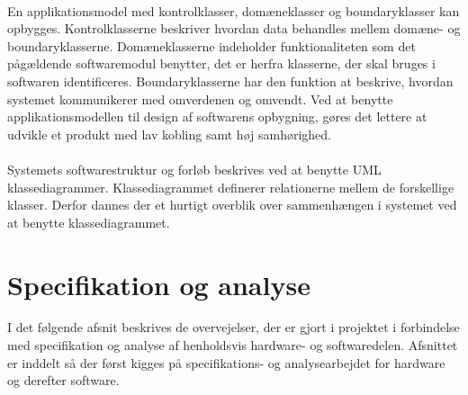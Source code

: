 \\
En applikationsmodel med kontrolklasser, domæneklasser og boundaryklasser kan opbygges. Kontrolklasserne beskriver hvordan data behandles mellem domæne- og boundaryklasserne. Domæneklasserne indeholder funktionaliteten som det pågældende softwaremodul benytter, det er herfra klasserne, der skal bruges i softwaren identificeres. Boundaryklasserne har den funktion at beskrive, hvordan systemet kommunikerer med omverdenen og omvendt. Ved at benytte applikationsmodellen til design af softwarens opbygning, gøres det lettere at udvikle et produkt med lav kobling samt høj samhørighed. \\
\\
Systemets softwarestruktur og forløb beskrives ved at benytte UML klassediagrammer. Klassediagrammet definerer relationerne mellem de forskellige klasser. Derfor dannes der et hurtigt overblik over sammenhængen i systemet ved at benytte klassediagrammet.  
\section{Specifikation og analyse}
I det følgende afsnit beskrives de overvejelser, der er gjort i projektet i forbindelse med specifikation og analyse af henholdsvis hardware- og softwaredelen. Afsnittet er inddelt så der først kigges på specifikations- og analysearbejdet for hardware og derefter software.

